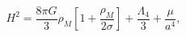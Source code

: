 \begin{equation}
H^2 = \frac{8\pi G}{3}\rho_M\left[1+\frac{\rho_M}{2\sigma}\right] +
\frac{\Lambda_4}{3} + \frac{\mu}{a^4}, 
\end{equation}


